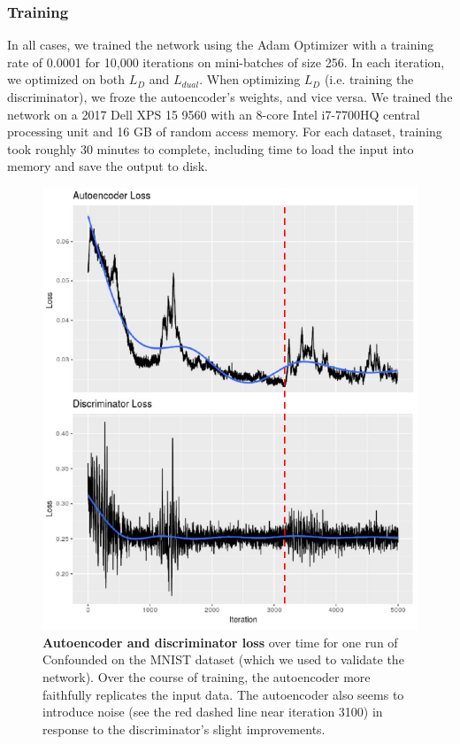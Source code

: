 \documentclass[11pt]{article}
\begin{document}
\subsubsection{Training}
In all cases, we trained the network using the Adam Optimizer \citep{kingma_adam_2014} with a training rate of 0.0001 for 10,000 iterations on mini-batches of size 256. %
In each iteration, we optimized on both $L_D$ and $L_{dual}$.
When optimizing $L_D$ (i.e. training the discriminator), we froze the autoencoder's weights, and vice versa.
We trained the network on a 2017 Dell XPS 15 9560 with an 8-core Intel i7-7700HQ central processing unit and 16 GB of random access memory.
For each dataset, training took roughly 30 minutes to complete, including time to load the input into memory and save the output to disk. %

\begin{figure}
	\centering
	\includegraphics[width=\columnwidth]{figures/final/training_loss.pdf}
	\caption[Autoencoder and discriminator loss]{\textbf{Autoencoder and discriminator loss} over time for one run of Confounded on the MNIST dataset (which we used to validate the network).
	Over the course of training, the autoencoder more faithfully replicates the input data.
	The autoencoder also seems to introduce noise (see the red dashed line near iteration 3100) in response to the discriminator's slight improvements.}
	\label{fig:training_loss}
\end{figure}
\end{document}
